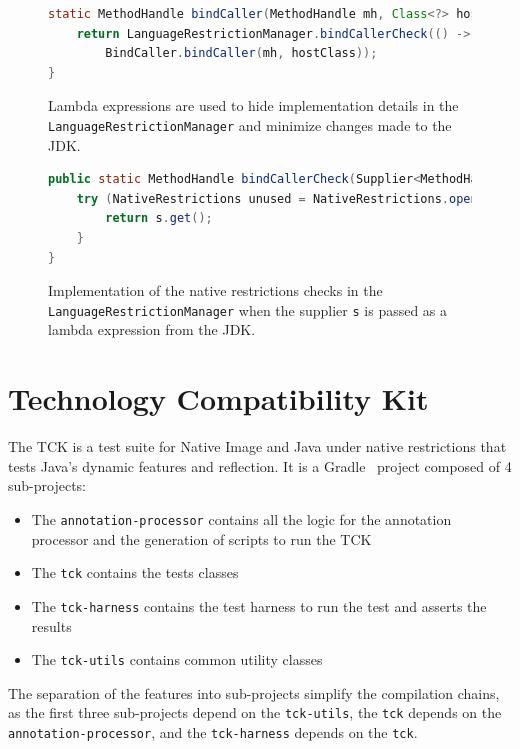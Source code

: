 \begin{figure}[ht]
    \centering
\begin{lstlisting}[language=Java]
static MethodHandle bindCaller(MethodHandle mh, Class<?> hostClass) {
    return LanguageRestrictionManager.bindCallerCheck(() -> 
        BindCaller.bindCaller(mh, hostClass));
}
\end{lstlisting}
    \caption{Lambda expressions are used to hide implementation details in the \texttt{LanguageRestrictionManager} and minimize changes made to the JDK.}
    \label{fig:bind_caller_lambda}
\end{figure}

\begin{figure}[ht]
    \centering
\begin{lstlisting}[language=Java]
public static MethodHandle bindCallerCheck(Supplier<MethodHandle> s) {
    try (NativeRestrictions unused = NativeRestrictions.openScope()) {
        return s.get();
    }
}
\end{lstlisting}
    \caption{Implementation of the native restrictions checks in the \texttt{LanguageRestrictionManager} when the supplier \texttt{s} is passed as a lambda expression from the JDK.}
    \label{fig:bind_caller_lrm}
\end{figure}

\section{Technology Compatibility Kit}\label{TCK}
The TCK is a test suite for Native Image and Java under native restrictions that tests Java's dynamic features and reflection. 
It is a Gradle~\cite{noauthor_gradle_2024} project composed of 4 sub-projects: 
\begin{itemize}
    \item The \verb|annotation-processor| contains all the logic for the annotation processor and the generation of scripts to run the TCK
    \item The \verb|tck| contains the tests classes
    \item The \verb|tck-harness| contains the test harness to run the test and asserts the results
    \item The \verb|tck-utils| contains common utility classes
\end{itemize}
The separation of the features into sub-projects simplify the compilation chains, as the first three sub-projects depend on the \verb|tck-utils|, the \verb|tck| depends on the \verb|annotation-processor|, and the \verb|tck-harness| depends on the \verb|tck|.

